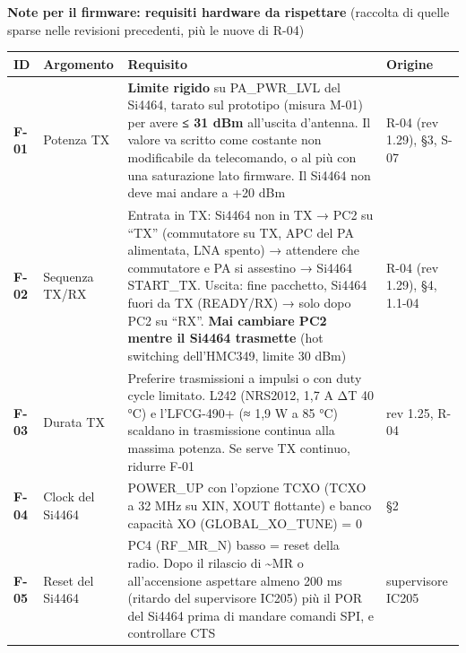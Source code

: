 \begin{notebox}
\textbf{Note per il firmware: requisiti hardware da rispettare} (raccolta di quelle sparse nelle revisioni precedenti, più le nuove di R-04)

\begin{center}{\footnotesize{}\setlength{\tabcolsep}{4pt}\renewcommand{\arraystretch}{1.0}
\begin{tabularx}{\linewidth}{>{\hsize=0.2652\hsize\raggedright\arraybackslash}X>{\hsize=0.6524\hsize\raggedright\arraybackslash}X>{\hsize=2.4016\hsize\raggedright\arraybackslash}X>{\hsize=0.6808\hsize\raggedright\arraybackslash}X}
\toprule
\textbf{ID} & \textbf{Argomento} & \textbf{Requisito} & \textbf{Origine} \\
\midrule
\textbf{F-01} & Potenza TX & \textbf{Limite rigido} su PA\_\allowbreak{}PWR\_\allowbreak{}LVL del Si4464, tarato sul prototipo (misura M-01) per avere \textbf{≤ 31 dBm} all'uscita d'antenna. Il valore va scritto come costante non modificabile da telecomando, o al più con una saturazione lato firmware. Il Si4464 non deve mai andare a +20 dBm & R-04 (rev 1.29), §3, S-07 \\\midrule[0.15pt]
\textbf{F-02} & Sequenza TX/\allowbreak{}RX & Entrata in TX: Si4464 non in TX → PC2 su \textquotedblleft{}TX\textquotedblright{} (commutatore su TX, APC del PA alimentata, LNA spento) → attendere che commutatore e PA si assestino → Si4464 START\_\allowbreak{}TX. Uscita: fine pacchetto, Si4464 fuori da TX (READY/\allowbreak{}RX) → solo dopo PC2 su \textquotedblleft{}RX\textquotedblright{}. \textbf{Mai cambiare PC2 mentre il Si4464 trasmette} (hot switching dell'HMC349, limite 30 dBm) & R-04 (rev 1.29), §4, 1.1-04 \\\midrule[0.15pt]
\textbf{F-03} & Durata TX & Preferire trasmissioni a impulsi o con duty cycle limitato. L242 (NRS2012, 1,7 A ΔT 40 °C) e l'LFCG-490+ (≈ 1,9 W a 85 °C) scaldano in trasmissione continua alla massima potenza. Se serve TX continuo, ridurre F-01 & rev 1.25, R-04 \\\midrule[0.15pt]
\textbf{F-04} & Clock del Si4464 & POWER\_\allowbreak{}UP con l'opzione TCXO (TCXO a 32 MHz su XIN, XOUT flottante) e banco capacità XO (GLOBAL\_\allowbreak{}XO\_\allowbreak{}TUNE) = 0 & §2 \\\midrule[0.15pt]
\textbf{F-05} & Reset del Si4464 & PC4 (RF\_\allowbreak{}MR\_\allowbreak{}N) basso = reset della radio. Dopo il rilascio di \textasciitilde{}MR o all'accensione aspettare almeno 200 ms (ritardo del supervisore IC205) più il POR del Si4464 prima di mandare comandi SPI, e controllare CTS & supervisore IC205 \\\midrule[0.15pt]

\end{tabularx}}
\end{center}
\end{notebox}
